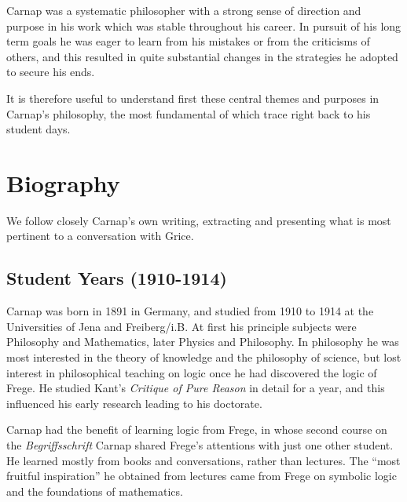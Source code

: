 \documentclass[10pt,titlepage]{book}
\begin{document}
Carnap was a systematic philosopher with a strong sense of direction and purpose in his work which was stable throughout his career.
In pursuit of his long term goals he was eager to learn from his mistakes or from the criticisms of others, and this resulted in quite substantial changes in the strategies he adopted to secure his ends.

It is therefore useful to understand first these central themes and purposes in Carnap's philosophy, the most fundamental of which trace right back to his student days.

\section{Biography}

We follow closely Carnap's own writing, extracting and presenting what is most pertinent to a conversation with Grice.

\subsection{Student Years (1910-1914)}

Carnap was born in 1891 in Germany, and studied from 1910 to 1914 at the Universities of Jena and Freiberg/i.B.
At first his principle subjects were Philosophy and Mathematics, later Physics and Philosophy.
In philosophy he was most interested in the theory of knowledge and the philosophy of science, but lost interest in philosophical teaching on logic once he had discovered the logic of Frege.
He studied Kant's \emph{Critique of Pure Reason} in detail for a year, and this influenced his early research leading to his doctorate.

Carnap had the benefit of learning logic from Frege, in whose second course on the {\it Begriffsschrift} Carnap shared Frege's attentions with just one other student.
He learned mostly from books and conversations, rather than lectures.
The ``most fruitful inspiration'' he obtained from lectures came from Frege on symbolic logic and the foundations of mathematics.
\end{document}
